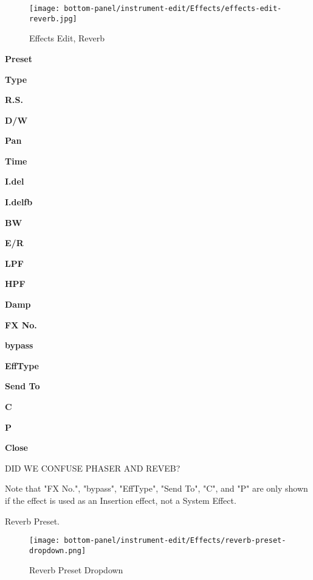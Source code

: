 \begin{figure}[H]
   \centering
   \texttt{[image: bottom-panel/instrument-edit/Effects/effects-edit-reverb.jpg]}
   \caption{Effects Edit, Reverb}
   \label{fig:effects_edit_reverb}
\end{figure}

   \begin{enumber}
      \item \textbf{Preset}
      \item \textbf{Type}
      \item \textbf{R.S.}
      \item \textbf{D/W}
      \item \textbf{Pan}
      \item \textbf{Time}
      \item \textbf{I.del}
      \item \textbf{I.delfb}
      \item \textbf{BW}
      \item \textbf{E/R}
      \item \textbf{LPF}
      \item \textbf{HPF}
      \item \textbf{Damp}
      \item \textbf{FX No.}
      \item \textbf{bypass}
      \item \textbf{EffType}
      \item \textbf{Send To}
      \item \textbf{C}
      \item \textbf{P}
      \item \textbf{Close}
   \end{enumber}

   DID WE CONFUSE PHASER AND REVEB?

   Note that "FX No.", "bypass", "EffType", "Send To", "C", and "P" are only
   shown if the effect is used as an Insertion effect, not a System Effect.

   \setcounter{ItemCounter}{0}      %

      Reverb Preset.

\begin{figure}[H]
   \centering
   \texttt{[image: bottom-panel/instrument-edit/Effects/reverb-preset-dropdown.png]}
   \caption{Reverb Preset Dropdown}
   \label{fig:reverb_preset_dropdown}
\end{figure}

